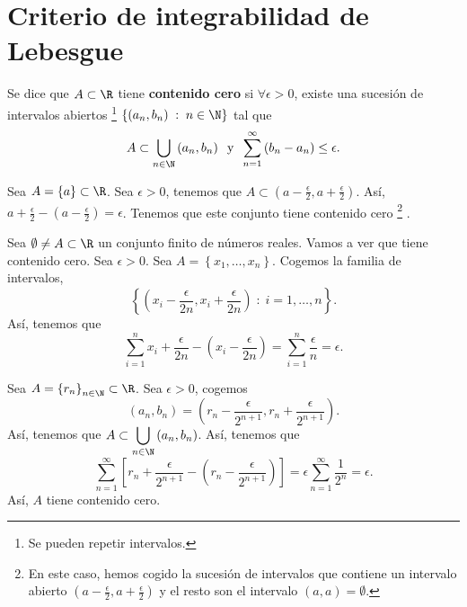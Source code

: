 \section{Criterio de integrabilidad de Lebesgue}
\begin{fdefinition}
	\normalfont Se dice que $\displaystyle A \subset \R $ tiene \textbf{contenido cero} si $\displaystyle \forall \epsilon > 0 $, existe una sucesión de intervalos abiertos \footnote{Se pueden repetir intervalos.} $\displaystyle \left\{ \left(a_{n}, b_{n}\right) \; : \; n \in \N\right\}  $ tal que 
	\[  A \subset \bigcup_{n \in \N}\left(a_{n}, b_{n}\right)  \;\; \text{y} \;\;  \sum^{\infty}_{n=1}\left(b_{n}-a_{n}\right) \leq \epsilon.\]
\end{fdefinition}
\begin{eg}
	\normalfont Sea $\displaystyle A = \left\{ a\right\} \subset \R $. Sea $\displaystyle \epsilon > 0 $, tenemos que $\displaystyle A \subset \left(a - \frac{\epsilon }{2}, a + \frac{\epsilon }{2}\right) $. Así, $\displaystyle a + \frac{\epsilon }{2}-\left(a-\frac{\epsilon }{2}\right) = \epsilon $. Tenemos que este conjunto tiene contenido cero \footnote{En este caso, hemos cogido la sucesión de intervalos que contiene un intervalo abierto $\displaystyle \left(a - \frac{\epsilon }{2}, a + \frac{\epsilon }{2}\right) $ y el resto son el intervalo $\displaystyle \left(a,a\right) = \emptyset $.} . 
\end{eg}
\begin{eg}
	\normalfont Sea $\displaystyle \emptyset \neq A \subset \R $ un conjunto finito de números reales. Vamos a ver que tiene contenido cero. Sea $\displaystyle \epsilon > 0 $. Sea $\displaystyle A = \left\{ x_{1}, \ldots, x_{n}\right\}  $. Cogemos la familia de intervalos,
	\[ \left\{ \left(x_{i}-\frac{\epsilon }{2n}, x_{i}+\frac{\epsilon }{2n}\right) \; : \; i = 1, \ldots, n\right\}  .\]
	Así, tenemos que 
\[\sum^{n}_{i=1} x_{i}+\frac{\epsilon }{2n} - \left(x_{i} - \frac{\epsilon }{2n}\right) = \sum^{n}_{i=1}\frac{\epsilon }{n} = \epsilon.\]
\end{eg}
\begin{eg}
	\normalfont Sea $\displaystyle A = \left\{ r_{n}\right\}_{n\in\N} \subset \R $. Sea $\displaystyle \epsilon > 0 $, cogemos  
	\[ \left(a_{n},b_{n}\right) = \left(r_{n}-\frac{\epsilon }{2^{n+1}}, r_{n} + \frac{\epsilon }{2^{n+1}}\right) .\]
	Así, tenemos que $\displaystyle A \subset \bigcup_{n \in \N}\left(a_{n}, b_{n}\right) $. Así, tenemos que 
	\[\sum^{\infty}_{n=1}\left[r_{n} + \frac{\epsilon }{2^{n+1}} - \left(r_{n}-\frac{\epsilon }{2^{n+1}}\right)\right] = \epsilon \sum^{\infty}_{n=1}\frac{1}{2^{n}} = \epsilon .\]
Así, $\displaystyle A $ tiene contenido cero.	
\end{eg}
